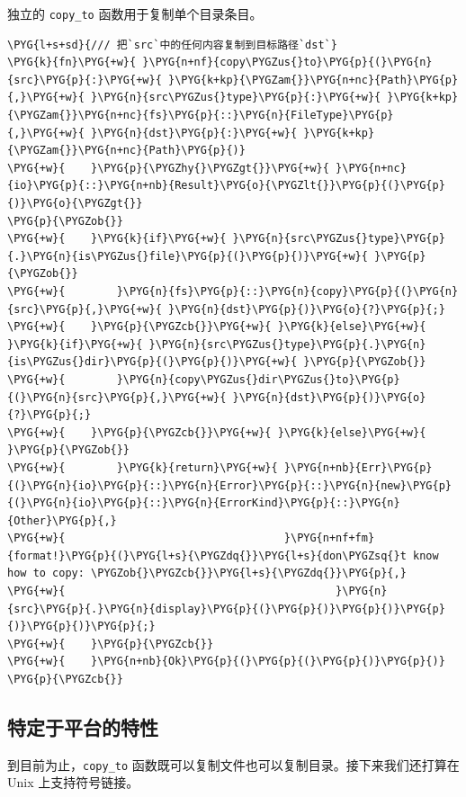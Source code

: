 独立的 \texttt{copy\_to} 函数用于复制单个目录条目。

\begin{Verbatim}[commandchars=\\\{\},breaklines=true,breakanywhere=true,fontsize=\codefont,xleftmargin=17bp]
\PYG{l+s+sd}{/// 把`src`中的任何内容复制到目标路径`dst`}
\PYG{k}{fn}\PYG{+w}{ }\PYG{n+nf}{copy\PYGZus{}to}\PYG{p}{(}\PYG{n}{src}\PYG{p}{:}\PYG{+w}{ }\PYG{k+kp}{\PYGZam{}}\PYG{n+nc}{Path}\PYG{p}{,}\PYG{+w}{ }\PYG{n}{src\PYGZus{}type}\PYG{p}{:}\PYG{+w}{ }\PYG{k+kp}{\PYGZam{}}\PYG{n+nc}{fs}\PYG{p}{::}\PYG{n}{FileType}\PYG{p}{,}\PYG{+w}{ }\PYG{n}{dst}\PYG{p}{:}\PYG{+w}{ }\PYG{k+kp}{\PYGZam{}}\PYG{n+nc}{Path}\PYG{p}{)}
\PYG{+w}{    }\PYG{p}{\PYGZhy{}\PYGZgt{}}\PYG{+w}{ }\PYG{n+nc}{io}\PYG{p}{::}\PYG{n+nb}{Result}\PYG{o}{\PYGZlt{}}\PYG{p}{(}\PYG{p}{)}\PYG{o}{\PYGZgt{}}
\PYG{p}{\PYGZob{}}
\PYG{+w}{    }\PYG{k}{if}\PYG{+w}{ }\PYG{n}{src\PYGZus{}type}\PYG{p}{.}\PYG{n}{is\PYGZus{}file}\PYG{p}{(}\PYG{p}{)}\PYG{+w}{ }\PYG{p}{\PYGZob{}}
\PYG{+w}{        }\PYG{n}{fs}\PYG{p}{::}\PYG{n}{copy}\PYG{p}{(}\PYG{n}{src}\PYG{p}{,}\PYG{+w}{ }\PYG{n}{dst}\PYG{p}{)}\PYG{o}{?}\PYG{p}{;}
\PYG{+w}{    }\PYG{p}{\PYGZcb{}}\PYG{+w}{ }\PYG{k}{else}\PYG{+w}{ }\PYG{k}{if}\PYG{+w}{ }\PYG{n}{src\PYGZus{}type}\PYG{p}{.}\PYG{n}{is\PYGZus{}dir}\PYG{p}{(}\PYG{p}{)}\PYG{+w}{ }\PYG{p}{\PYGZob{}}
\PYG{+w}{        }\PYG{n}{copy\PYGZus{}dir\PYGZus{}to}\PYG{p}{(}\PYG{n}{src}\PYG{p}{,}\PYG{+w}{ }\PYG{n}{dst}\PYG{p}{)}\PYG{o}{?}\PYG{p}{;}
\PYG{+w}{    }\PYG{p}{\PYGZcb{}}\PYG{+w}{ }\PYG{k}{else}\PYG{+w}{ }\PYG{p}{\PYGZob{}}
\PYG{+w}{        }\PYG{k}{return}\PYG{+w}{ }\PYG{n+nb}{Err}\PYG{p}{(}\PYG{n}{io}\PYG{p}{::}\PYG{n}{Error}\PYG{p}{::}\PYG{n}{new}\PYG{p}{(}\PYG{n}{io}\PYG{p}{::}\PYG{n}{ErrorKind}\PYG{p}{::}\PYG{n}{Other}\PYG{p}{,}
\PYG{+w}{                                  }\PYG{n+nf+fm}{format!}\PYG{p}{(}\PYG{l+s}{\PYGZdq{}}\PYG{l+s}{don\PYGZsq{}t know how to copy: \PYGZob{}\PYGZcb{}}\PYG{l+s}{\PYGZdq{}}\PYG{p}{,}
\PYG{+w}{                                          }\PYG{n}{src}\PYG{p}{.}\PYG{n}{display}\PYG{p}{(}\PYG{p}{)}\PYG{p}{)}\PYG{p}{)}\PYG{p}{)}\PYG{p}{;}
\PYG{+w}{    }\PYG{p}{\PYGZcb{}}
\PYG{+w}{    }\PYG{n+nb}{Ok}\PYG{p}{(}\PYG{p}{(}\PYG{p}{)}\PYG{p}{)}
\PYG{p}{\PYGZcb{}}
\end{Verbatim}

\subsection{特定于平台的特性}

到目前为止，\texttt{copy\_to} 函数既可以复制文件也可以复制目录。接下来我们还打算在 Unix 上支持符号链接。

